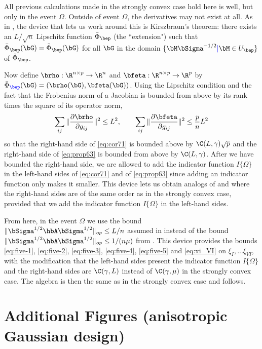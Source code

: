 \documentclass{colt2022} %
\newcommand{\ysc}[1]{{\color{blue} #1}}
\numberwithin{equation}{section}
\begin{document}
All previous calculations made in the strongly convex case hold
here is well, but only in the event $\Omega$. Outside of event $\Omega$,
the derivatives may not exist at all.
As in , the device that lets us work around
this is Kirszbraun's theorem: there exists
an $L/\sqrt n$ Lipschitz function
$\bar\Phi_{\bep}$  (the \ysc{``}extension") such that
$\bar\Phi_{\bep}(\bG)=\tilde\Phi_{\bep}(\bG)$
for all $\bG$ in the domain 
$\{\bM\bSigma^{-1/2} \ysc{\mid} \bM\in U_{\bep} \}$ of $\tilde\Phi_{\bep}$.

Now define $\brho:\R^{n\times p}\to \R^n$ and $\bfeta:\R^{n\times p}\to\R^p$
by $\bar\Phi\ysc{_{\bep}}(\bG)=(\brho(\bG), \bfeta(\bG))$.
Using the Lipschitz condition and the fact that the Frobenius norm
of a Jacobian is bounded from above by \ysc{its} rank times the square of
its operator norm,
$$
\sum_{ij}
\|
\frac{\partial \brho}{\partial g_{ij}}
\|^2
\le L^2,
\qquad
\sum_{ij}
\|
\frac{\partial \bfeta}{\partial g_{ij}}
\|^2
\le \frac{p}{n} L^2
$$
so that the right-hand side of \eqref{eq:cor71} is bounded above
by $\C(L,\gamma) \sqrt p$ and the right-hand side
of \eqref{eq:prop63} is bounded from above
by $\C(L,\gamma)$. After we have bounded the right-hand side,
we are allowed to add the indicator function $I\{\Omega\}$
in the left-hand sides of \eqref{eq:cor71} and
of \eqref{eq:prop63} since adding an indicator function only
makes it smaller.
This \ysc{device} lets us obtain analogs of
and 
where the right-hand sides are of the same order as in the strongly convex
case, provided that we add the indicator function $I\{\Omega\}$
in the left-hand sides.

From here, in the event $\Omega$
we use the bound $\|\bSigma^{1/2}\hbA\bSigma^{1/2}\|_{op}\le L/n$
assumed in  instead of 
the bound $\|\bSigma^{1/2}\hbA\bSigma^{1/2}\|_{op}\le 1/(n\mu)$
from .
This device provides the bounds
\eqref{eq:five-1}, 
\eqref{eq:five-2}, 
\eqref{eq:five-3}, 
\eqref{eq:five-4}, 
\eqref{eq:five-5} and
\eqref{eq:xi_VI}
on $\xi_I, ... \xi_{VI}$, with the modification that the left-hand sides
present the indicator function $I\{\Omega\}$ and the right-hand sides
are $\C(\gamma, L)$ instead of $\C(\gamma,\mu)$ in the strongly convex case.
The algebra is then the same as in the strongly convex case
and  follows.


\newpage
\section{Additional Figures (anisotropic Gaussian design)}
\label{additional-figures}
\end{document}
